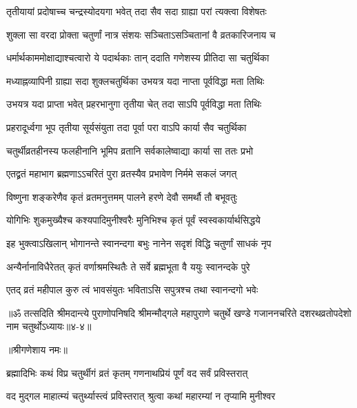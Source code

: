 \twolineshloka
{तृतीयायां प्रदोषाच्च चन्द्रस्योदयगा भवेत्}
{तदा सैव सदा ग्राह्या परां त्यक्त्वा विशेषतः} %

\twolineshloka
{शुक्ला सा वरदा प्रोक्ता चतुर्णां नात्र संशयः}
{सञ्चिताऽसञ्चितानां वै व्रतकारिजनाय च} %

\twolineshloka
{धर्मार्थकाममोक्षाद्याश्चत्वारो ये पदार्थकाः}
{तान् ददाति गणेशस्य प्रीतिदा सा चतुर्थिका} %

\twolineshloka
{मध्याह्नव्यापिनी ग्राह्या सदा शुक्लचतुर्थिका}
{उभयत्र यदा नाप्ता पूर्वविद्धा मता तिथिः} %

\twolineshloka
{उभयत्र यदा प्राप्ता भवेत् प्रहरभानुगा}
{तृतीया चेत् तदा साऽपि पूर्वविद्धा मता तिथिः} %

\twolineshloka
{प्रहरादूर्ध्वगा भूप तृतीया सूर्यसंयुता}
{तदा पूर्वा परा वाऽपि कार्या सैव चतुर्थिका} %

\twolineshloka
{चतुर्थीव्रतहीनस्य फलहीनानि भूमिप}
{व्रतानि सर्वकालेष्वाद्या कार्या सा ततः प्रभो} %

\twolineshloka
{एतद्व्रतं महाभाग ब्रह्मणाऽऽचरितं पुरा}
{व्रतस्यैव प्रभावेण निर्ममे सकलं जगत्} %

\twolineshloka
{विष्णुना शङ्करेणैव कृतं व्रतमनुत्तमम्}
{पालने हरणे देवौ समर्थौ तौ बभूवतुः} %

\twolineshloka
{योगिभिः शुकमुख्यैश्च कश्यपादिमुनीश्वरैः}
{मुनिभिश्च कृतं पूर्वं स्वस्वकार्यार्थसिद्धये} %

\twolineshloka
{इह भुक्त्वाऽखिलान् भोगानन्ते स्वानन्दगा बभुः}
{नानेन सदृशं विद्धि चतुर्णां साधकं नृप} %

\twolineshloka
{अन्यैर्नानाविधैरेतत् कृतं वर्णाश्रमस्थितैः}
{ते सर्वे ब्रह्मभूता वै ययुः स्वानन्दके पुरे} %

\twolineshloka
{एतद् व्रतं महीपाल कुरु त्वं भावसंयुतः}
{भविताऽसि सपुत्रश्च तथा स्वानन्दगो भवेः} %

॥ॐ तत्सदिति श्रीमदान्त्ये पुराणोपनिषदि श्रीमन्मौद्गले महापुराणे चतुर्थे खण्डे गजाननचरिते दशरथव्रतोपदेशो नाम चतुर्थोऽध्यायः॥४-४॥


\label{sec:chaturthiviveka-varnanam}

\centerline{॥श्रीगणेशाय नमः॥}


\twolineshloka
{ब्रह्मादिभिः कथं विप्र चतुर्थीगं व्रतं कृतम्}
{गणनाथप्रियं पूर्णं वद सर्वं प्रविस्तरात्} %


\twolineshloka
{वद मुद्गल माहात्म्यं चतुर्थ्यास्त्वं प्रविस्तरात्}
{श्रुत्वा कथां महारम्यां न तृप्यामि मुनीश्वर} %

